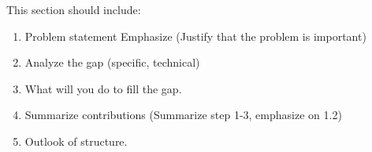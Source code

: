 This section should include:
\begin{enumerate}
\item Problem statement
	\subitem Emphasize (Justify that the problem is important)
\item Analyze the gap (specific, technical)
\item What will you do to fill the gap.
\item Summarize contributions (Summarize step 1-3, emphasize on 1.2)
\item Outlook of structure. 
\end{enumerate}
